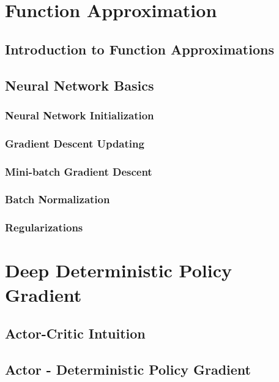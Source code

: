 
\section{Function Approximation}
\subsection{Introduction to Function Approximations}
\subsection{Neural Network Basics}
\subsubsection{Neural Network Initialization}
\subsubsection{Gradient Descent Updating}
\subsubsection{Mini-batch Gradient Descent}
\subsubsection{Batch Normalization}
\subsubsection{Regularizations}




\section{Deep Deterministic Policy Gradient}
\subsection{Actor-Critic Intuition}
\subsection{Actor - Deterministic Policy Gradient}
